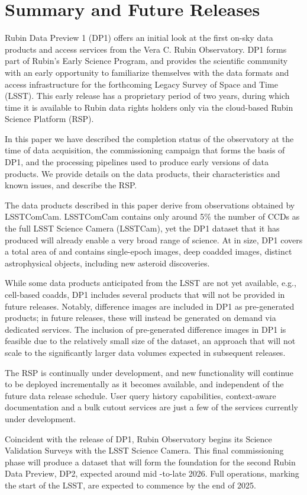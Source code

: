 \section{Summary and Future Releases
\label{sec:summary}}

Rubin Data Preview 1 (\gls{DP1}) offers an initial look at the first on-sky data products and access services from the Vera C. Rubin Observatory. \gls{DP1} forms part of Rubin's Early Science Program, and provides the scientific community with an early opportunity to familiarize themselves with the data formats and access infrastructure for the forthcoming Legacy Survey of Space and Time (LSST).
This early release has a proprietary period of two years, during which time it is  available to Rubin data rights holders only via the cloud-based Rubin Science Platform (\gls{RSP}).

In this paper we have described the completion status of the observatory at the time of data acquisition, the commissioning campaign that forms the basis of \gls{DP1}, and the processing pipelines used to produce early versions of data products.
We provide details on the data products, their characteristics and
known issues, and describe the \gls{RSP}.

The data products described in this paper derive from observations obtained by \gls{LSSTComCam}. \gls{LSSTComCam} contains only around 5\% the number of CCDs as the full LSST Science Camera (LSSTCam), yet the DP1 dataset that it has produced will already enable a very broad range of science.
At \sizeinbytes in size, DP1 covers a total area of \totalarea and contains \nexposures single-\gls{epoch} images, \ndeepcoadds deep coadded images, \nobjects distinct astrophysical objects, including  \nnewasteroiddiscoveries  new asteroid discoveries.

While some data products anticipated from the LSST are not yet available, e.g., cell-based coadds, DP1 includes several products that will not be provided in future releases.
Notably, difference images are included in DP1 as pre-generated products; in future releases, these will instead be generated on demand via dedicated services.
The inclusion of pre-generated difference images in DP1 is feasible due to the relatively small size of the dataset, an approach that will not scale to the significantly larger data volumes expected in subsequent releases.

The \gls{RSP} is continually under development, and new functionality will continue to be deployed incrementally as it becomes available, and independent of the future data release schedule.
User query history capabilities, context-aware documentation and a bulk cutout services are just a few of the services currently under development.

Coincident with the release of DP1, Rubin Observatory begins its Science Validation Surveys with the LSST Science Camera.
This final commissioning phase will produce a dataset that will form the foundation for the second Rubin Data Preview, \gls{DP2}, expected around mid -to-late 2026.
Full operations, marking the start of the \gls{LSST}, are expected to commence by the end of 2025.